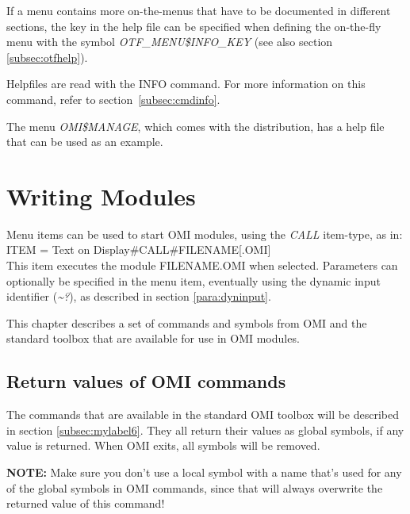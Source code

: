 \documentclass[a4paper]{book}
\newcommand{\vs}{\vspace{3mm}}
\begin{document}
If a menu contains more on-the-menus that have to be documented in different sections, the key in the help file can be specified when defining the on-the-fly menu with the symbol \textsl{OTF{\_}MENU{\$}INFO{\_}KEY} (see also section \ref{subsec:otfhelp}).

\vs

Helpfiles are read with the \textsf{INFO} command. For
more information on this command, refer to section~\ref{subsec:cmdinfo}.


\vs

The menu \textsl{OMI{\$}MANAGE}, which comes with the distribution,
has a help file that can be used as an example.

\chapter{Writing Modules}
\label{sec:writing}

Menu items can be used to start OMI modules, using the \textsl{CALL} item-type, as 
in: \\
\noindent\textsf{ITEM = Text on Display{\#}CALL{\#}FILENAME[.OMI]} \\
This item executes the module FILENAME.OMI when selected. Parameters can 
optionally be specified in the menu item, eventually using the dynamic input 
identifier (\textsl{\~{}?}), as described in section \ref{para:dyninput}.

\vs

This chapter describes a set of commands and symbols from OMI and the 
standard toolbox that are available for use in OMI modules.

\section{Return values of OMI commands}
\label{subsec:return}

The commands that are available in the standard OMI toolbox will be 
described in section \ref{subsec:mylabel6}. They all return their values as global symbols, if 
any value is returned. When OMI exits, all symbols will be removed.

\vs

\hspace{-8mm}\textbf{NOTE:} Make sure you don't use a local symbol with a name that's 
used for any of the global symbols in OMI commands, since that will always 
overwrite the returned value of this command!
\end{document}
